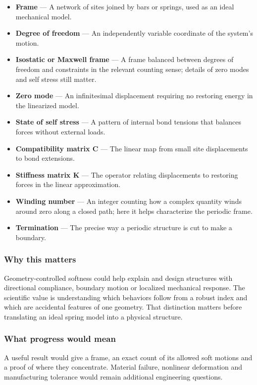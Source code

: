 \documentclass[
  11pt,
]{article}
\begin{document}
\begin{itemize}
\item
  \textbf{Frame} --- A network of sites joined by bars or springs, used
  as an ideal mechanical model.
\item
  \textbf{Degree of freedom} --- An independently variable coordinate of
  the system's motion.
\item
  \textbf{Isostatic or Maxwell frame} --- A frame balanced between
  degrees of freedom and constraints in the relevant counting sense;
  details of zero modes and self stress still matter.
\item
  \textbf{Zero mode} --- An infinitesimal displacement requiring no
  restoring energy in the linearized model.
\item
  \textbf{State of self stress} --- A pattern of internal bond tensions
  that balances forces without external loads.
\item
  \textbf{Compatibility matrix C} --- The linear map from small site
  displacements to bond extensions.
\item
  \textbf{Stiffness matrix K} --- The operator relating displacements to
  restoring forces in the linear approximation.
\item
  \textbf{Winding number} --- An integer counting how a complex quantity
  winds around zero along a closed path; here it helps characterize the
  periodic frame.
\item
  \textbf{Termination} --- The precise way a periodic structure is cut
  to make a boundary.
\end{itemize}

\subsubsection{Why this matters}

Geometry-controlled softness could help explain and design structures
with directional compliance, boundary motion or localized mechanical
response. The scientific value is understanding which behaviors follow
from a robust index and which are accidental features of one geometry.
That distinction matters before translating an ideal spring model into a
physical structure.

\subsubsection{What progress would mean}

A useful result would give a frame, an exact count of its allowed soft
motions and a proof of where they concentrate. Material failure,
nonlinear deformation and manufacturing tolerance would remain
additional engineering questions.
\end{document}
